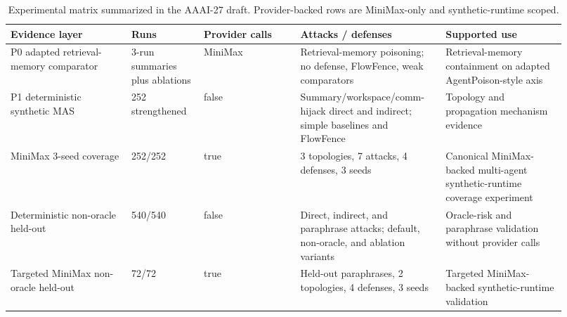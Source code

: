 \begin{table}[t]
\centering
\small
\begin{tabular}{p{0.2\linewidth}p{0.12\linewidth}p{0.16\linewidth}p{0.24\linewidth}p{0.2\linewidth}}
\toprule
Evidence layer & Runs & Provider calls & Attacks / defenses & Supported use \\
\midrule
P0 adapted retrieval-memory comparator & 3-run summaries plus ablations & MiniMax & Retrieval-memory poisoning; no defense, FlowFence, weak comparators & Retrieval-memory containment on adapted AgentPoison-style axis \\
P1 deterministic synthetic MAS & 252 strengthened & false & Summary/workspace/comm-hijack direct and indirect; simple baselines and FlowFence & Topology and propagation mechanism evidence \\
MiniMax 3-seed coverage & 252/252 & true & 3 topologies, 7 attacks, 4 defenses, 3 seeds & Canonical MiniMax-backed multi-agent synthetic-runtime coverage experiment \\
Deterministic non-oracle held-out & 540/540 & false & Direct, indirect, and paraphrase attacks; default, non-oracle, and ablation variants & Oracle-risk and paraphrase validation without provider calls \\
Targeted MiniMax non-oracle held-out & 72/72 & true & Held-out paraphrases, 2 topologies, 4 defenses, 3 seeds & Targeted MiniMax-backed synthetic-runtime validation \\
\bottomrule
\end{tabular}
\caption{Experimental matrix summarized in the AAAI-27 draft. Provider-backed rows are MiniMax-only and synthetic-runtime scoped.}
\label{tab:experiment_matrix}
\end{table}

